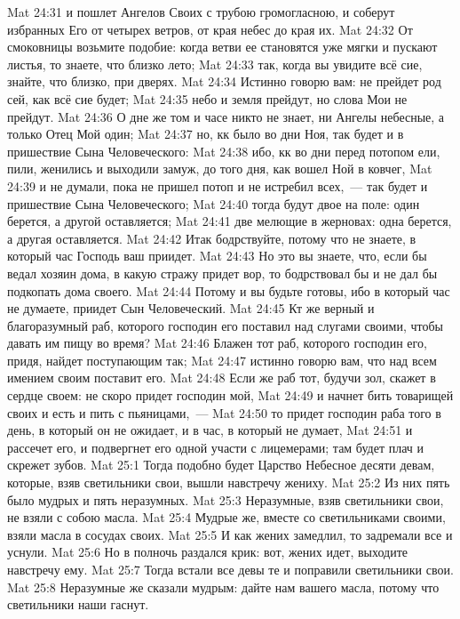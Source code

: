 \vs Mat 24:31 и пошлет Ангелов Своих с трубою громогласною, и соберут избранных Его от четырех ветров, от края небес до края их.
\vs Mat 24:32 От смоковницы возьмите подобие: когда ветви ее становятся уже мягки и пускают листья, то знаете, что близко лето;
\vs Mat 24:33 так, когда вы увидите всё сие, знайте, что близко, при дверях.
\vs Mat 24:34 Истинно говорю вам: не прейдет род сей, как всё сие будет;
\vs Mat 24:35 небо и земля прейдут, но слова Мои не прейдут.
\vs Mat 24:36 О дне же том и часе никто не знает, ни Ангелы небесные, а только Отец Мой один;
\vs Mat 24:37 но, кк было во дни Ноя, так будет и в пришествие Сына Человеческого:
\vs Mat 24:38 ибо, кк во дни перед потопом ели, пили, женились и выходили замуж, до того дня, как вошел Ной в ковчег,
\vs Mat 24:39 и не думали, пока не пришел потоп и не истребил всех,~--- так будет и пришествие Сына Человеческого;
\vs Mat 24:40 тогда будут двое на поле: один берется, а другой оставляется;
\vs Mat 24:41 две мелющие в жерновах: одна берется, а другая оставляется.
\vs Mat 24:42 Итак бодрствуйте, потому что не знаете, в который час Господь ваш приидет.
\vs Mat 24:43 Но это вы знаете, что, если бы ведал хозяин дома, в какую стражу придет вор, то бодрствовал бы и не дал бы подкопать дома своего.
\vs Mat 24:44 Потому и вы будьте готовы, ибо в который час не думаете, приидет Сын Человеческий.
\vs Mat 24:45 Кт же верный и благоразумный раб, которого господин его поставил над слугами своими, чтобы давать им пищу во время?
\vs Mat 24:46 Блажен тот раб, которого господин его, придя, найдет поступающим так;
\vs Mat 24:47 истинно говорю вам, что над всем имением своим поставит его.
\vs Mat 24:48 Если же раб тот, будучи зол, скажет в сердце своем: не скоро придет господин мой,
\vs Mat 24:49 и начнет бить товарищей своих и есть и пить с пьяницами,~---
\vs Mat 24:50 то придет господин раба того в день, в который он не ожидает, и в час, в который не думает,
\vs Mat 24:51 и рассечет его, и подвергнет его одной участи с лицемерами; там будет плач и скрежет зубов.
\vs Mat 25:1 Тогда подобно будет Царство Небесное десяти девам, которые, взяв светильники свои, вышли навстречу жениху.
\vs Mat 25:2 Из них пять было мудрых и пять неразумных.
\vs Mat 25:3 Неразумные, взяв светильники свои, не взяли с собою масла.
\vs Mat 25:4 Мудрые же, вместе со светильниками своими, взяли масла в сосудах своих.
\vs Mat 25:5 И как жених замедлил, то задремали все и уснули.
\vs Mat 25:6 Но в полночь раздался крик: вот, жених идет, выходите навстречу ему.
\vs Mat 25:7 Тогда встали все девы те и поправили светильники свои.
\vs Mat 25:8 Неразумные же сказали мудрым: дайте нам вашего масла, потому что светильники наши гаснут.
